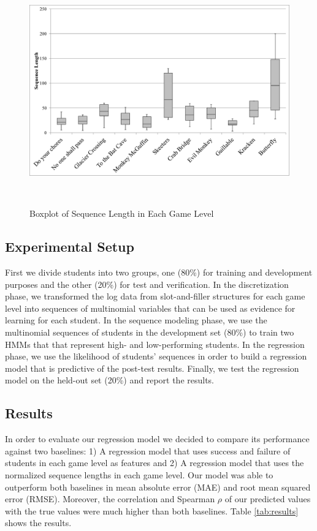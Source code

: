 \documentclass{sigchi}
\begin{document}
\begin{figure}
	\centering
	\includegraphics[width=0.9\columnwidth]{figures/boxplot.pdf}
	\caption{Boxplot of Sequence Length in Each Game Level}~\label{fig:boxplot}
\end{figure}

\subsection{Experimental Setup}
First we divide students into two groups, one (80\%) for training and development purposes and the other (20\%) for test and verification.
In the discretization phase, we transformed the log data from slot-and-filler structures for each game level into sequences of multinomial variables that can be used as evidence for learning for each student.
In the sequence modeling phase, we use the multinomial sequences of students in the development set (80\%) to train two HMMs that that represent high- and low-performing students.
In the regression phase, we use the likelihood of students' sequences in order to build a regression model that is predictive of the post-test results.
Finally, we test the regression model on the held-out set (20\%) and report the results.


\subsection{Results}
In order to evaluate our regression model we decided to compare its performance against two baselines: 1) A regression model that uses success and failure of students in each game level as features and 2) A regression model that uses the normalized sequence lengths in each game level. 
Our model was able to outperform both baselines in mean absolute error (MAE) and root mean squared error (RMSE). 
Moreover, the correlation and Spearman $\rho$ of our predicted values with the true values were much higher than both baselines. 
Table \ref{tab:results} shows the results.
\end{document}
